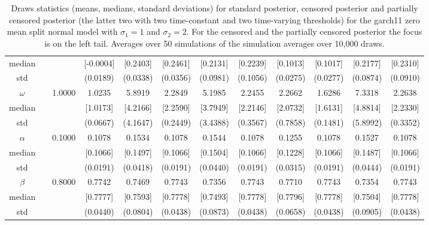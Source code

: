 {\begin{sidewaystable}
\begin{tabular}{cc cc| cccc| cccc}
median &&  & [-0.0004] & [0.2403] & [0.2461] & [0.2131] & [0.2239] & [0.1013] & [0.1017] & [0.2177] & [0.2310]  \\ 
std &&   & (0.0189) & (0.0338) & (0.0356) & (0.0981) & (0.1056) &(0.0275) & (0.0277) & (0.0874) & (0.0910)  \\ 
 \rowcolor{LightCyan} 
$\omega$&& 1.0000 & 1.0235 & 5.8919 & 2.2849 & 5.1985 & 2.2455 & 2.2662 & 1.6286 & 7.3318 & 2.2638  \\   
median &&  & [1.0173] & [4.2166] & [2.2590] & [3.7949] & [2.2146] & [2.0732] & [1.6131] & [4.8814] & [2.2330]  \\ 
std &&   & (0.0667) & (4.1647) & (0.2449) & (3.4388) & (0.3567) &(0.7858) & (0.1481) & (5.8992) & (0.3352)  \\ 
 \rowcolor{LightCyan} 
$\alpha$&& 0.1000 & 0.1078 & 0.1534 & 0.1078 & 0.1544 & 0.1078 & 0.1255 & 0.1078 & 0.1527 & 0.1078  \\   
median &&  & [0.1066] & [0.1497] & [0.1066] & [0.1504] & [0.1066] & [0.1228] & [0.1066] & [0.1487] & [0.1066]  \\ 
std &&   & (0.0191) & (0.0418) & (0.0191) & (0.0440) & (0.0191) &(0.0315) & (0.0191) & (0.0444) & (0.0191)  \\ 
 \rowcolor{LightCyan} 
$\beta$&& 0.8000 & 0.7742 & 0.7469 & 0.7743 & 0.7356 & 0.7743 & 0.7710 & 0.7743 & 0.7354 & 0.7743  \\   
median &&  & [0.7777] & [0.7593] & [0.7778] & [0.7493] & [0.7778] & [0.7796] & [0.7778] & [0.7504] & [0.7778]  \\ 
std &&   & (0.0440) & (0.0804) & (0.0438) & (0.0873) & (0.0438) &(0.0658) & (0.0438) & (0.0905) & (0.0438)  \\ 
\hline 
\end{tabular}
 \caption{Draws statistics (means, medians, standard deviations) for standard posterior, censored posterior and partially censored posterior (the latter two with two time-constant and two time-varying thresholds) for the garch11 zero mean split normal model with $\sigma_{1} = 1$ and $\sigma_{2} = 2$. For the censored and the partially censored posterior the focus is on the left tail. Averages over 50 simulations of the simulation averages over 10,000 draws.} 
\label{tab:garch11_pcp_draws}  
\end{sidewaystable}
}